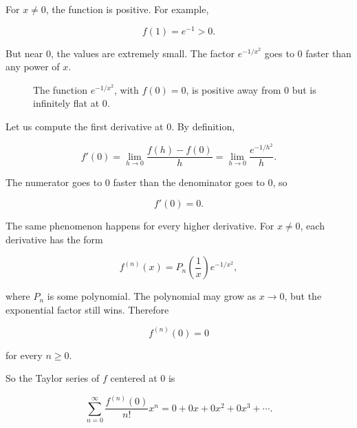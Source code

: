For \(x\neq0\), the function is positive.  For example,

\[
f(1)=e^{-1}>0.
\]

But near \(0\), the values are extremely small.  The factor \(e^{-1/x^2}\) goes to \(0\)
faster than any power of \(x\).

\begin{figure}[h]
\centering
{}
\caption{The function \(e^{-1/x^2}\), with \(f(0)=0\), is positive away from \(0\) but is infinitely flat at \(0\).}
\label{fig:flat-function}
\end{figure}

Let us compute the first derivative at \(0\).  By definition,

\[
f'(0)=\lim_{h\to0}\frac{f(h)-f(0)}{h}
=
\lim_{h\to0}\frac{e^{-1/h^2}}{h}.
\]

The numerator goes to \(0\) faster than the denominator goes to \(0\), so

\[
f'(0)=0.
\]

The same phenomenon happens for every higher derivative.  For \(x\neq0\), each
derivative has the form

\[
f^{(n)}(x)=P_n\left(\frac1x\right)e^{-1/x^2},
\]

where \(P_n\) is some polynomial.  The polynomial may grow as \(x\to0\), but the
exponential factor still wins.  Therefore

\[
f^{(n)}(0)=0
\]

for every \(n\ge0\).

So the Taylor series of \(f\) centered at \(0\) is

\[
\sum_{n=0}^{\infty}\frac{f^{(n)}(0)}{n!}x^n
=
0+0x+0x^2+0x^3+\cdots.
\]

